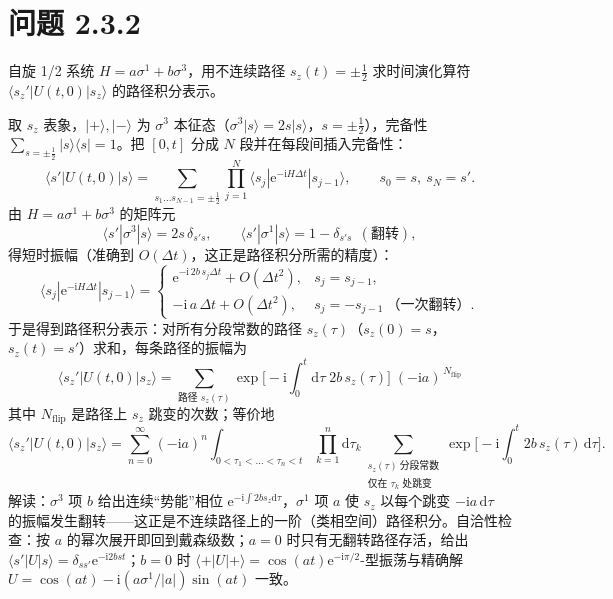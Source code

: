 \section*{问题 2.3.2}
\begin{problem}
自旋 1/2 系统 $H=a\sigma^1+b\sigma^3$，用不连续路径 $s_z(t)=\pm\frac12$ 求时间演化算符 $\langle s_z'|U(t,0)|s_z\rangle$ 的路径积分表示。
\end{problem}
\solution
取 $s_z$ 表象，$|+\rangle,|-\rangle$ 为 $\sigma^3$ 本征态（$\sigma^3|s\rangle=2s|s\rangle$，$s=\pm\frac12$），完备性 $\sum_{s=\pm\frac12}|s\rangle\langle s|=1$。把 $[0,t]$ 分成 $N$ 段并在每段间插入完备性：
\begin{equation*}
\langle s'|U(t,0)|s\rangle=\sum_{s_1\dots s_{N-1}=\pm\frac12}
\prod_{j=1}^{N}\langle s_j|\mathrm{e}^{-\mathrm{i}H\Delta t}|s_{j-1}\rangle,
\qquad s_0=s,\ s_N=s' .
\end{equation*}
由 $H=a\sigma^1+b\sigma^3$ 的矩阵元
\begin{equation*}
\langle s'|\sigma^3|s\rangle=2s\,\delta_{s's},\qquad
\langle s'|\sigma^1|s\rangle=1-\delta_{s's}\ \ (\text{翻转}),
\end{equation*}
得短时振幅（准确到 $O(\Delta t)$，这正是路径积分所需的精度）：
\begin{equation*}
\langle s_j|\mathrm{e}^{-\mathrm{i}H\Delta t}|s_{j-1}\rangle
=\begin{cases}
\mathrm{e}^{-\mathrm{i}\,2b\,s_{j}\Delta t}+O(\Delta t^2), & s_j=s_{j-1},\\[1ex]
-\mathrm{i}\,a\,\Delta t+O(\Delta t^2), & s_j=-s_{j-1}\ \text{（一次翻转）}.
\end{cases}
\end{equation*}
于是得到路径积分表示：对所有分段常数的路径 $s_z(\tau)$（$s_z(0)=s$，$s_z(t)=s'$）求和，每条路径的振幅为
\begin{equation*}
\boxed{\;
\langle s_z'|U(t,0)|s_z\rangle
=\sum_{\text{路径 } s_z(\tau)}
\exp\Big[-\mathrm{i}\int_0^t\mathrm{d}\tau\;2b\,s_z(\tau)\Big]\;(-\mathrm{i}a)^{\,N_{\text{flip}}}\;}
\end{equation*}
其中 $N_{\text{flip}}$ 是路径上 $s_z$ 跳变的次数；等价地
\begin{equation*}
\langle s_z'|U(t,0)|s_z\rangle
=\sum_{n=0}^{\infty}(-\mathrm{i}a)^n\!\!\int_{0<\tau_1<\dots<\tau_n<t}\prod_{k=1}^n\mathrm{d}\tau_k
\sum_{\substack{s_z(\tau)\ \text{分段常数}\\ \text{仅在 }\tau_k\text{ 处跳变}}}
\exp\Big[-\mathrm{i}\int_0^t 2b\,s_z(\tau)\,\mathrm{d}\tau\Big].
\end{equation*}
解读：$\sigma^3$ 项 $b$ 给出连续“势能”相位 $\mathrm{e}^{-\mathrm{i}\int 2bs_z\mathrm{d}\tau}$，$\sigma^1$ 项 $a$ 使 $s_z$ 以每个跳变 $-\mathrm{i}a\,\mathrm{d}\tau$ 的振幅发生翻转——这正是不连续路径上的一阶（类相空间）路径积分。自洽性检查：按 $a$ 的幂次展开即回到戴森级数；$a=0$ 时只有无翻转路径存活，给出 $\langle s'|U|s\rangle=\delta_{ss'}\mathrm{e}^{-\mathrm{i}2bst}$；$b=0$ 时 $\langle+|U|+\rangle=\cos(at)\mathrm{e}^{-\mathrm{i}\pi/2}$-型振荡与精确解 $U=\cos(at)-\mathrm{i}(a\sigma^1/|a|)\sin(at)$ 一致。

